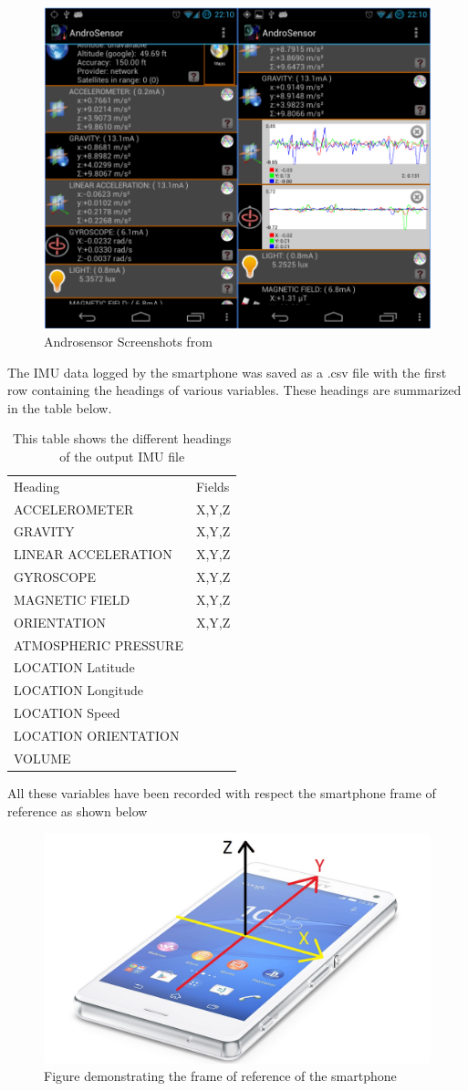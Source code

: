 \begin{figure}[!ht] 
\captionsetup{width=0.5\linewidth, font=small}  
\includegraphics[width=0.5\linewidth]{figures/as.png}
\caption{Androsensor Screenshots from \cite{androsensor}}
\label{fig:as}
\end{figure}

The IMU data logged by the smartphone was saved as a .csv file with the first row containing the headings of various variables. These headings are summarized in the table below.

\begin{table}
\centering
\caption{This table shows the different headings of the output IMU file}
\label{IMU Headings}
\begin{tabular}{ll}
Heading               & Fields  \\
ACCELEROMETER       & X,Y,Z  \\
GRAVITY              & X,Y,Z \\
LINEAR ACCELERATION  & X,Y,Z\\
GYROSCOPE            & X,Y,Z \\
MAGNETIC FIELD       &  X,Y,Z\\
ORIENTATION          &  X,Y,Z\\
ATMOSPHERIC PRESSURE  &      \\
LOCATION Latitude     &       \\
LOCATION Longitude    &       \\
LOCATION Speed        &       \\
LOCATION ORIENTATION  &       \\
VOLUME
\end{tabular}
\end{table}

All these variables have been recorded with respect the smartphone frame of reference as shown below

\begin{figure}[!ht] 
\captionsetup{width=0.5\linewidth, font=small}  
\includegraphics[width=0.5\linewidth]{figures/phone.jpg}
\caption{Figure demonstrating the frame of reference of the smartphone}
\label{fig:phone}
\end{figure}


